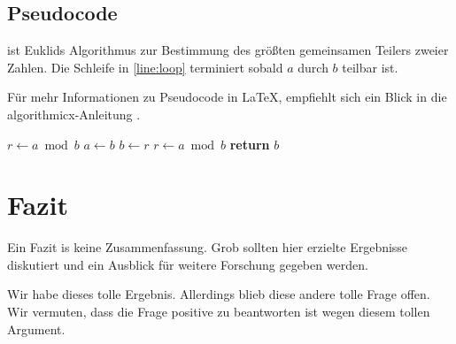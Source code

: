 \documentclass[a4paper,titlepage,onecolumn,twoside,12pt,ngerman,titlepage=firstiscover]{scrbook}
\theoremstyle{plain} %
\theoremstyle{definition} %
\theoremstyle{remark} %
\theoremstyle{plain}
\newcommand{\NN}{\mathbb{N}} %
\begin{document}
\section{Pseudocode}

 ist Euklids Algorithmus zur Bestimmung des größten gemeinsamen Teilers zweier Zahlen.
Die Schleife in \cref{line:loop} terminiert sobald $a$ durch $b$ teilbar ist.

Für mehr Informationen zu Pseudocode in \LaTeX, empfiehlt sich ein Blick in die algorithmicx-Anleitung \cite{algorithmicx}.



\begin{algorithm}
\caption{Euklids Algorithmus}\label{alg:euclid}
\begin{algorithmic}[1]
\Input{$a, b \in \NN$}
	\State $r\gets a\bmod b$ 
	 \label{line:loop}
		\State $a\gets b$
		\State $b\gets r$
		\State $r\gets a\bmod b$
	\EndWhile
	\State \textbf{return} $b$
\EndFunction
\end{algorithmic}
\end{algorithm}


\chapter{Fazit}

Ein Fazit is keine Zusammenfassung.
Grob sollten hier erzielte Ergebnisse diskutiert und ein Ausblick für weitere Forschung gegeben werden.

Wir habe dieses tolle Ergebnis.
Allerdings blieb diese andere tolle Frage offen.
Wir vermuten, dass die Frage positive zu beantworten ist wegen diesem tollen Argument.

\end{document}
